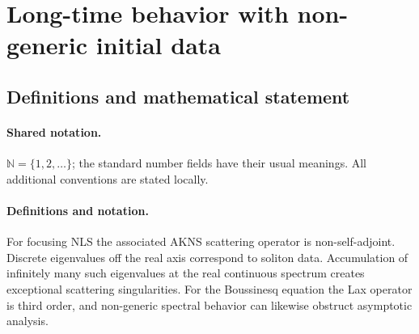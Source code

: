 \documentclass[11pt]{article}
\begin{document}
\section{Long-time behavior with non-generic initial data}\label{statement}

\subsection{Definitions and mathematical statement}

\paragraph{Shared notation.}$\mathbb N=\{1,2,\ldots\}$; the standard number fields have their usual meanings. All additional conventions are stated locally.


\paragraph{Definitions and notation.}For focusing NLS the associated AKNS scattering operator is non-self-adjoint. Discrete eigenvalues off the real axis correspond to soliton data. Accumulation of infinitely many such eigenvalues at the real continuous spectrum creates exceptional scattering singularities. For the Boussinesq equation the Lax operator is third order, and non-generic spectral behavior can likewise obstruct asymptotic analysis.
\end{document}
